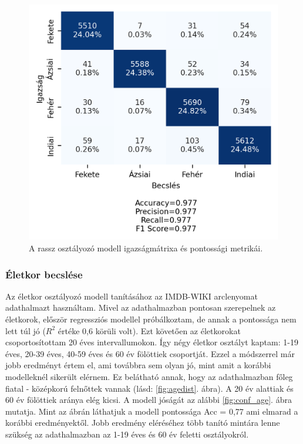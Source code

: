 \begin{figure}[ht]
	\centering
	\includegraphics[width=0.7\columnwidth]{figures/conf_race.png}
	\caption{A rassz osztályozó modell igazságmátrixa és pontossági metrikái.}
	\label{fig:conf_race}
\end{figure}

\subsubsection*{Életkor becslése}
Az életkor osztályozó modell tanításához az IMDB-WIKI arclenyomat adathalmazt használtam. Mivel az adathalmazban pontosan szerepelnek az életkorok, először regressziós modellel próbálkoztam, de annak a pontossága nem lett túl jó ($R^2$ értéke 0,6 körüli volt). Ezt követően az életkorokat csoportosítottam 20 éves intervallumokon. Így négy életkor osztályt kaptam: 1-19 éves, 20-39 éves, 40-59 éves és 60 év fölöttiek csoportját. Ezzel a módszerrel már jobb eredményt értem el, ami továbbra sem olyan jó, mint amit a korábbi modelleknél sikerült elérnem. Ez belátható annak, hogy az adathalmazban főleg fiatal - középkorú felnőttek vannak (lásd: \ref{fig:agedist}. ábra). A 20 év alattiak és 60 év fölöttiek aránya elég kicsi. A modell jóságát az alábbi \ref{fig:conf_age}. ábra mutatja. Mint az ábrán láthatjuk a modell pontossága Acc = 0,77 ami elmarad a korábbi eredményektől. Jobb eredmény eléréséhez több tanító mintára lenne szükség az adathalmazban az 1-19 éves és 60 év feletti osztályokról.

